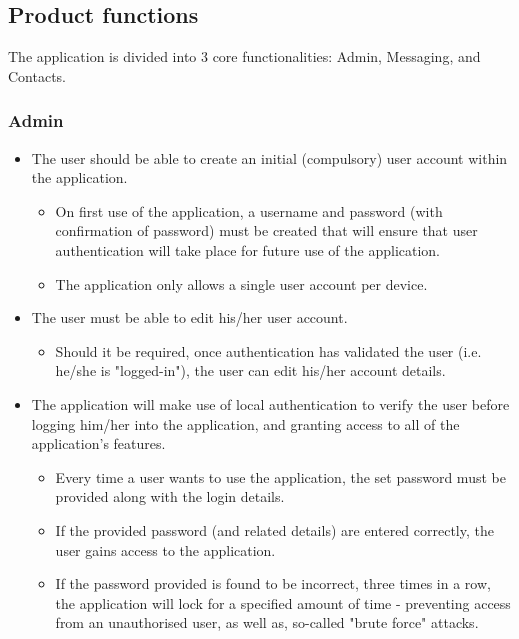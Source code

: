 \subsection{Product functions}
The application is divided into 3 core functionalities: Admin, Messaging, and Contacts.

\subsubsection{Admin}
\begin{itemize}
\item The user should be able to create an initial (compulsory) user account within the application.
\begin{itemize}
\item On first use of the application, a username and password (with confirmation of password) must be created that will ensure that user authentication will take place for future use of the application.
\item The application only allows a single user account per device.
\end{itemize}
\item The user must be able to edit his/her user account.
\begin{itemize}
\item Should it be required, once authentication has validated the user (i.e. he/she is "logged-in"), the user can edit his/her account details.
\end{itemize}
\item The application will make use of local authentication to verify the user before logging him/her into the application, and granting access to all of the application's features.
\begin{itemize}
\item Every time a user wants to use the application, the set password must be provided along with the login details.
\item If the provided password (and related details) are entered correctly, the user gains access to the application.
\item If the password provided is found to be incorrect, three times in a row, the application will lock for a specified amount of time - preventing access from an unauthorised user, as well as, so-called "brute force" attacks.
\end{itemize}
\end{itemize}

